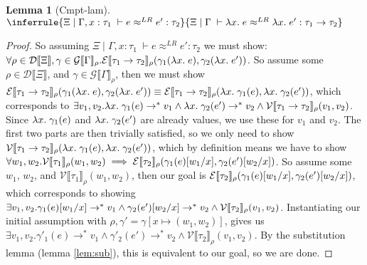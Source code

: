 \documentclass[a4paper, 11pt]{report}
\newtheorem{lemma}[theorem]{Lemma}
\theoremstyle{definition}
\newcommand{\var}{x}
\newcommand{\expr}{e}
\newcommand{\val}{v}
\newcommand{\valB}{w}
\newcommand{\subst}[3]{#1{\left[#3 \middle/ #2 \right]}}
\newcommand{\Tfunc}[2]{#1 \rightarrow #2}
\newcommand{\typ}{\tau}
\newcommand{\venv}{\Gamma}
\newcommand{\tenv}{\Xi}
\newcommand{\jdgRel}[6]{#1 \; | \; #2 \; \vdash #3 \approx^{#4} #5 : #6}
\newcommand{\stepS}{\rightarrow^*}
\newcommand{\ValInp}[2]{\mathcal{V} \llbracket #1 \rrbracket_{#2}}
\newcommand{\ExpInp}[2]{\mathcal{E} \llbracket #1 \rrbracket_{#2}}
\newcommand{\VenvInp}[2]{\mathcal{G} \llbracket #1 \rrbracket_{#2}}
\newcommand{\TenvInp}[1]{\mathcal{D} \llbracket #1 \rrbracket}
\newcommand{\LogRel}[5]{\jdgRel{#1}{#2}{#3}{LR}{#4}{#5}}
\newcommand{\map}[2]{#1 \mapsto #2}
\begin{document}
\begin{lemma}[Cmpt-lam]
  $\inferrule
  { \LogRel{\tenv}{\venv, x : \typ_1}{\expr}{\expr'}{\typ_2} }
  { \LogRel{\tenv}{\venv}{\fun \var . \expr}{\fun \var . \expr'}{\Tfunc{\typ_1}{\typ_2}} }$
\end{lemma}
\begin{proof}
  So assuming $\LogRel{\tenv}{\venv, x : \typ_1}{\expr}{\expr'}{\typ_2}$ we must show: $\forall \rho \in \TenvInp{\tenv}, \gamma \in \VenvInp{\venv}{\rho} . \ExpInp{\Tfunc{\typ_1}{\typ_2}}{\rho}(\gamma_1(\fun \var . \expr), \gamma_2(\fun \var . \expr'))$. So assume some $\rho \in \TenvInp{\tenv}$, and $\gamma \in \VenvInp{\venv}{\rho}$, then we must show $\ExpInp{\Tfunc{\typ_1}{\typ_2}}{\rho}(\gamma_1(\fun \var . \expr), \gamma_2(\fun \var . \expr')) \equiv \ExpInp{\Tfunc{\typ_1}{\typ_2}}{\rho}(\fun \var . \gamma_1(\expr), \fun \var . \gamma_2(\expr'))$, which corresponds to $\exists \val_1, \val_2 . \fun \var . \gamma_1(\expr) \stepS \val_1 \land \fun \var . \gamma_2(\expr') \stepS \val_2 \land \ValInp{\Tfunc{\typ_1}{\typ_2}}{\rho}(\val_1, \val_2)$.\\
  Since $\fun \var . \gamma_1(\expr)$ and $\fun \var . \gamma_2(\expr')$ are already values, we use these for $\val_1$ and $\val_2$. The first two parts are then trivially satisfied, so we only need to show $\ValInp{\Tfunc{\typ_1}{\typ_2}}{\rho}(\fun \var . \gamma_1(\expr), \fun \var . \gamma_2(\expr'))$, which by definition means we have to show $\forall \valB_1, \valB_2 . \ValInp{\typ_1}{\rho}(\valB_{1}, \valB_{2}) \implies
  \ExpInp{\typ_2}{\rho}(\subst{\gamma_1(\expr)}{\var}{\valB_1}, \subst{\gamma_2(\expr')}{\var}{\valB_2})$. So assume some $\valB_1$, $\valB_2$, and $\ValInp{\typ_1}{\rho}(\valB_{1}, \valB_{2})$, then our goal is $\ExpInp{\typ_2}{\rho}(\subst{\gamma_1(\expr)}{\var}{\valB_1}, \subst{\gamma_2(\expr')}{\var}{\valB_2})$, which corresponds to showing $\exists \val_1, \val_2 . \subst{\gamma_1(\expr)}{\var}{\valB_1} \stepS \val_1 \land \subst{\gamma_2(\expr')}{\var}{\valB_2} \stepS \val_2 \land \ValInp{\typ_2}{\rho}(\val_1, \val_2)$. Instantiating our initial assumption with $\rho, \gamma' = \gamma[\map{\var}{(\valB_1, \valB_2)}]$, gives us
  $\exists \val_1, \val_2 . \gamma'_1(\expr) \stepS \val_1 \land \gamma'_2(\expr') \stepS \val_2 \land \ValInp{\typ_2}{\rho}(\val_1, \val_2)$. By the substitution lemma (lemma \ref{lem:sub}), this is equivalent to our goal, so we are done.
\end{proof}
\end{document}

